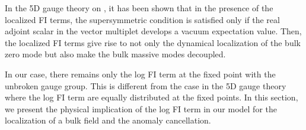 \documentclass[a4paper,12pt]{article}
\begin{document}
In the 5D \coordHE{} gauge theory on \coordHE{}, it has been shown that 
in the presence of the localized FI terms, 
the supersymmetric condition is satisfied
only if the real adjoint scalar in the vector multiplet develops
a vacuum expectation value\cite{peskin,ah2,barbieri,nilles}. 
Then, the localized FI
terms give rise to  not only the dynamical localization of the bulk zero mode  
but also make the bulk massive modes decoupled\cite{nilles}. 

In our case, there remains only the log FI term
at the fixed point with the unbroken gauge group.
This is different from the case in the 5D \coordHE{} gauge theory 
where the log FI term are equally distributed at the fixed points\cite{nilles}.
In this section, we present the physical implication of the log FI term in our
model for the localization of a bulk field and the anomaly cancellation. 
  
\end{document}
